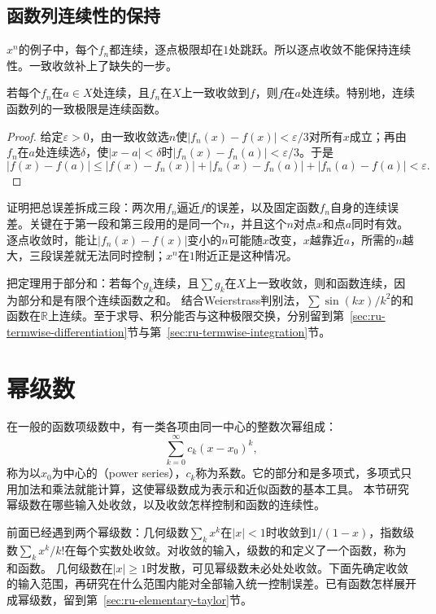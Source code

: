 \subsection{函数列连续性的保持}
\label{sec:ru-uniform-limit-continuity}

$x^n$的例子中，每个$f_n$都连续，逐点极限却在$1$处跳跃。所以逐点收敛不能保持连续性。一致收敛补上了缺失的一步。
\begin{theorem}[一致极限保持连续]
\label{thm:ru-uniform-limit-continuity}
若每个$f_n$在$a\in X$处连续，且$f_n$在$X$上一致收敛到$f$，则$f$在$a$处连续。特别地，连续函数列的一致极限是连续函数。
\end{theorem}
\begin{proof}
给定$\varepsilon>0$，由一致收敛选$n$使$|f_n(x)-f(x)|<\varepsilon/3$对所有$x$成立；再由$f_n$在$a$处连续选$\delta$，使$|x-a|<\delta$时$|f_n(x)-f_n(a)|<\varepsilon/3$。于是
\[
 |f(x)-f(a)|\leq|f(x)-f_n(x)|+|f_n(x)-f_n(a)|+|f_n(a)-f(a)|<\varepsilon.
\]
\end{proof}
证明把总误差拆成三段：两次用$f_n$逼近$f$的误差，以及固定函数$f_n$自身的连续误差。关键在于第一段和第三段用的是同一个$n$，并且这个$n$对点$x$和点$a$同时有效。
逐点收敛时，能让$|f_n(x)-f(x)|$变小的$n$可能随$x$改变，$x$越靠近$a$，所需的$n$越大，三段误差就无法同时控制；$x^n$在$1$附近正是这种情况。

把定理用于部分和：若每个$g_k$连续，且$\sum g_k$在$X$上一致收敛，则和函数连续，因为部分和是有限个连续函数之和。
结合Weierstrass判别法，$\sum\sin(kx)/k^2$的和函数在$\mathbb R$上连续。至于求导、积分能否与这种极限交换，分别留到第~\ref{sec:ru-termwise-differentiation}节与第~\ref{sec:ru-termwise-integration}节。
\section{幂级数}
\label{sec:ru-power-series}

在一般的函数项级数中，有一类各项由同一中心的整数次幂组成：
\[
 \sum_{k=0}^\infty c_k(x-x_0)^k,
\]
称为以$x_0$为中心的（power series），$c_k$称为系数。它的部分和是多项式，多项式只用加法和乘法就能计算，这使幂级数成为表示和近似函数的基本工具。
本节研究幂级数在哪些输入处收敛，以及收敛怎样控制和函数的连续性。

前面已经遇到两个幂级数：几何级数$\sum_kx^k$在$|x|<1$时收敛到$1/(1-x)$，指数级数$\sum_kx^k/k!$在每个实数处收敛。对收敛的输入，级数的和定义了一个函数，称为和函数。
几何级数在$|x|\geq1$时发散，可见幂级数未必处处收敛。下面先确定收敛的输入范围，再研究在什么范围内能对全部输入统一控制误差。已有函数怎样展开成幂级数，留到第~\ref{sec:ru-elementary-taylor}节。

